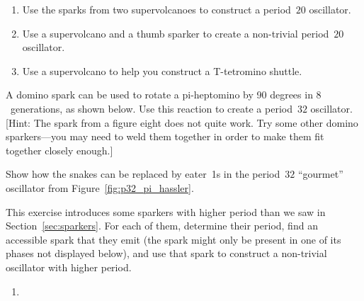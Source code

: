 \begin{multicols}{2}
\begin{problem}
		\begin{center}
		\end{center}
		
		\begin{enumerate}[label=\bf\color{ocre}(\alph*)]
			\item {} Use the sparks from two supervolcanoes to construct a period~$20$ oscillator.
			
			\item {} Use a supervolcano and a thumb sparker to create a non-trivial period~$20$ oscillator.
			
			\item {} Use a supervolcano to help you construct a T-tetromino shuttle.
		\end{enumerate}
	\end{problem}
	
	
	\mfilbreak
	
	
	\begin{problemstar}\label{exer:pi_hassle} 
		A domino spark can be used to rotate a pi-heptomino by 90 degrees in $8$~generations, as shown below. Use this reaction to create a period~$32$ oscillator. [Hint: The spark from a figure eight does not quite work. Try some other domino sparkers---you may need to weld them together in order to make them fit together closely enough.]
		\begin{center}
		\end{center}
	\end{problemstar}
	
	
	\mfilbreak
	
	
	\begin{problemstar}\label{exer:p32_pi_hassler_eaters} 
		Show how the snakes can be replaced by eater~1s in the period~$32$ ``gourmet'' oscillator from Figure~\ref{fig:p32_pi_hassler}.
	\end{problemstar}
	
	
	\mfilbreak
	
	
	\begin{problemstar}\label{exer:high_period_sparkers} 
		This exercise introduces some sparkers with higher period than we saw in Section~\ref{sec:sparkers}. For each of them, determine their period, find an accessible spark that they emit (the spark might only be present in one of its phases not displayed below), and use that spark to construct a non-trivial oscillator with higher period.
		\begin{multicols}{2}
			\begin{enumerate}
				\item[\bf\color{ocre}(a)] 
				

\end{enumerate}
\end{multicols}
\end{problemstar}
\end{multicols}
